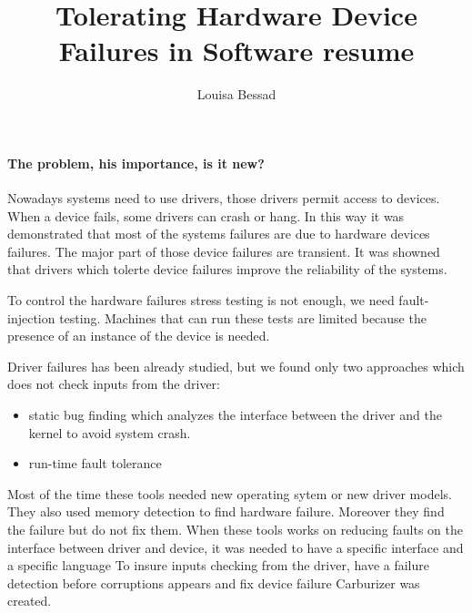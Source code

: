 \documentclass[10pt]{article}
\title{\textbf{Tolerating Hardware Device Failures in Software resume}}
\author{Louisa Bessad}
\begin{document}
\maketitle

\paragraph{The problem, his importance, is it new?}
Nowadays systems need to use drivers, those drivers permit access to devices.  When a device fails, some drivers can crash or hang. In this way it was demonstrated that most of the systems failures are due to hardware devices failures. The major part of those device failures are transient. It was showned that drivers which tolerte device failures improve the reliability of the systems. %

To control the hardware failures stress testing is not enough, we need fault-injection testing. Machines that can run these tests are limited because the presence of an instance of the device is needed.

Driver failures has been already studied, but we found only two approaches which does not check inputs from the driver:
\begin{itemize}
\item static bug finding which analyzes the interface between the driver and the kernel to avoid system crash.
\item run-time fault tolerance  
\end{itemize}
Most of the time these tools needed new operating sytem or new driver models. They also used memory detection to find hardware failure. Moreover they find the failure but do not fix them. When these tools works on reducing faults on the interface between driver and device, it was needed to have a specific interface and a specific language
To insure inputs checking from the driver, have a failure detection before corruptions appears and fix device failure Carburizer was created.
\end{document}
